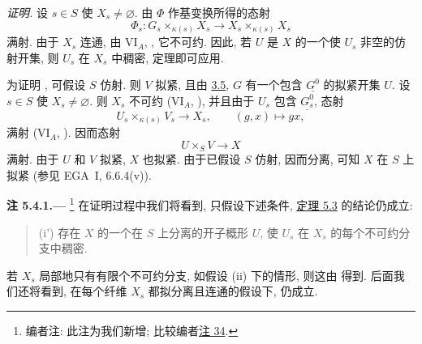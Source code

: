 \emph{证明.}
\textup{}
设 \(s\in S\) 使 \(X_s\ne\varnothing\).
由 \(\Phi\) 作基变换所得的态射
\[
  \Phi_s:
  G_s\times_{\kappa(s)}X_s
  \longrightarrow
  X_s\times_{\kappa(s)}X_s
\]
满射. 由于 \(X_s\) 连通, 由 VI\(_A\),
, 它不可约.
因此, 若 \(U\) 是 \(X\) 的一个使 \(U_s\) 非空的仿射开集,
则 \(U_s\) 在 \(X_s\) 中稠密, 定理即可应用.

为证明 \textup{},
可假设 \(S\) 仿射. 则 \(V\) 拟紧,
且由 \hyperref[prop:sga3-VIB-3.5]{3.5},
\(G\) 有一个包含 \(\underline{G^0}\) 的拟紧开集 \(U\).
设 \(s\in S\) 使 \(X_s\ne\varnothing\).
则 \(X_s\) 不可约 (VI\(_A\), ),
并且由于 \(U_s\) 包含 \(\underline{G_s^0}\), 态射
\[
  U_s\times_{\kappa(s)}V_s\longrightarrow X_s,
  \qquad (g,x)\longmapsto gx,
\]
满射 (VI\(_A\), ). 因而态射
\[
  U\times_SV\longrightarrow X
\]
满射. 由于 \(U\) 和 \(V\) 拟紧, \(X\) 也拟紧.
由于已假设 \(S\) 仿射, 因而分离,
可知 \(X\) 在 \(S\) 上拟紧 (参见 EGA~I, 6.6.4\textup{(v)}).

\medskip
{}\label{rem:sga3-VIB-5.4.1}%
\noindent\textbf{注 5.4.1.---}%
\footnote{\label{note:sga3-VIB-36}编者注: 此注为我们新增;
比较编者\hyperref[note:sga3-VIB-34]{注 34}.}
在证明过程中我们将看到, 只假设下述条件,
\hyperref[thm:sga3-VIB-5.3]{定理 5.3} 的结论仍成立:

\begin{quote}
\textup{(i')} 存在 \(X\) 的一个在 \(S\) 上分离的开子概形 \(U\),
使 \(U_s\) 在 \(X_s\) 的每个不可约分支中稠密.
\end{quote}

若 \(X_s\) 局部地只有有限个不可约分支,
如假设 \textup{(ii)} 下的情形, 则这由
\textup{} 得到.
后面我们还将看到, 在每个纤维 \(X_s\) 都拟分离且连通的假设下,
 仍成立.


